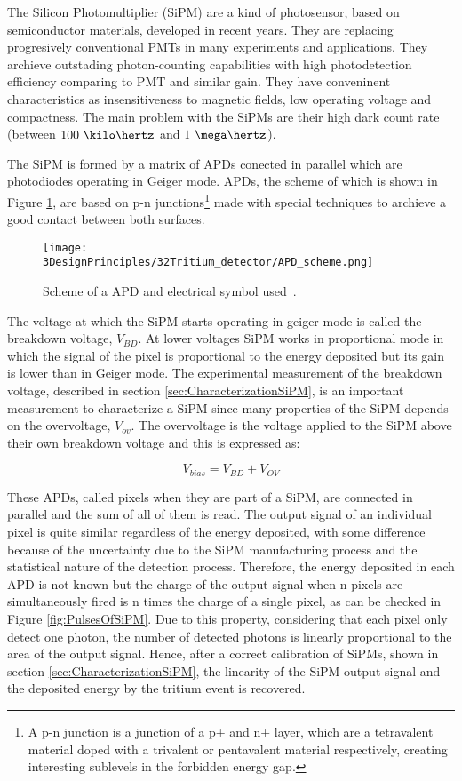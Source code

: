 The Silicon Photomultiplier (SiPM) are a kind of photosensor, based on semiconductor materials, developed in recent years. They are replacing progresively conventional PMTs in many experiments and applications. They archieve outstading photon-counting capabilities with high photodetection efficiency comparing to PMT and similar gain. They have conveninent characteristics as insensitiveness to magnetic fields, low operating voltage and compactness. The main problem with the SiPMs are their high dark count rate (between $100~\kilo\hertz$ and $1~\mega\hertz$).

The SiPM is formed by a matrix of APDs conected in parallel which are photodiodes operating in Geiger mode. APDs, the scheme of which is shown in Figure \ref{fig:SchemeAPD}, are based on p-n junctions\footnote{A p-n junction is a junction of a p+ and n+ layer, which are a tetravalent material doped with a trivalent or pentavalent material respectively, creating interesting sublevels in the forbidden energy gap.} made with special techniques to archieve a good contact between both surfaces.

\begin{figure}[htbp]
\centering
\texttt{[image: 3DesignPrinciples/32Tritium\_detector/APD\_scheme.png]}
\caption{Scheme of a APD and electrical symbol used\label{fig:SchemeAPD}~\cite{OSI}.}
\end{figure}
 

The voltage at which the SiPM starts operating in geiger mode is called the breakdown voltage, $V_ {BD}$. At lower voltages SiPM works in proportional mode in which the signal of the pixel is proportional to the energy deposited but its gain is lower than in Geiger mode. The experimental measurement of the breakdown voltage, described in section \ref{sec:CharacterizationSiPM}, is an important measurement to characterize a SiPM since many properties of the SiPM depends on the overvoltage, $V_{ov}$. The overvoltage is the voltage applied to the SiPM above their own breakdown voltage and this is expressed as:

\begin{equation}
V_{bias}=V_{BD}+V_{OV}
\label{overvoltage}
\end{equation}

These APDs, called pixels when they are part of a SiPM, are connected in parallel and the sum of all of them is read. The output signal of an individual pixel is quite similar regardless of the energy deposited, with some difference because of the uncertainty due to the SiPM manufacturing process and the statistical nature of the detection process. Therefore, the energy deposited in each APD is not known but the charge of the output signal when n pixels are simultaneously fired is n times the charge of a single pixel, as can be checked in Figure \ref{fig:PulsesOfSiPM}. Due to this property, considering that each pixel only detect one photon, the number of detected photons is linearly proportional to the area of the output signal. Hence, after a correct calibration of SiPMs, shown in section \ref{sec:CharacterizationSiPM}, the linearity of the SiPM output signal and the deposited energy by the tritium event is recovered.

